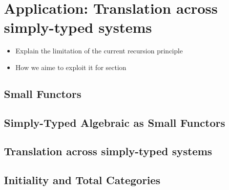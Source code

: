 \section{Application: Translation across simply-typed systems}

\begin{itemize}
  \item Explain the limitation of the current recursion principle
  \item How we aime to exploit it for section
\end{itemize}

\subsection{Small Functors}

\subsection{Simply-Typed Algebraic as Small Functors}

\subsection{Translation across simply-typed systems}

\subsection{Initiality and Total Categories}
